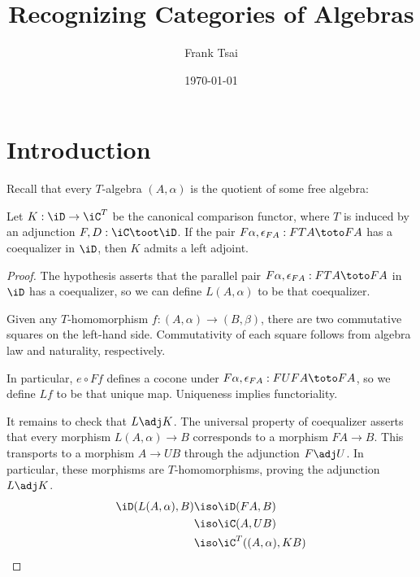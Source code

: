 \documentclass{amsart}
\title{Recognizing Categories of Algebras}
\author{Frank Tsai}
\date{\today}
\begin{document}
\maketitle
\tableofcontents

\section{Introduction}
\label{sec:introduction}

Recall that every $T$-algebra $(A,\alpha)$ is the quotient of some free algebra:
\begin{equation}
  \label{eq:beck-coequalizer}
  
\end{equation}

\begin{lem}\label{lem:beck-coequalizer-left-adjoint}
  Let $K : \iD \to \iC^{T}$ be the canonical comparison functor, where $T$ is induced by an adjunction $F,D : \iC \toot \iD$.
  If the pair $F\alpha,\epsilon_{FA} : FTA \toto FA$ has a coequalizer in $\iD$, then $K$ admits a left adjoint.
\end{lem}
\begin{proof}
  The hypothesis asserts that the parallel pair $F\alpha,\epsilon_{FA} : FTA \toto FA$ in $\iD$ has a coequalizer, so we can define $L(A,\alpha)$ to be that coequalizer.
  
  Given any $T$-homomorphism $f : (A,\alpha) \to (B,\beta)$, there are two commutative squares on the left-hand side.
  Commutativity of each square follows from algebra law and naturality, respectively.
  
  In particular, $e \circ Ff$ defines a cocone under $F\alpha,\epsilon_{FA} : FUFA \toto FA$, so we define $Lf$ to be that unique map.
  Uniqueness implies functoriality.

  It remains to check that $L \adj K$.
  The universal property of coequalizer asserts that every morphism $L(A,\alpha) \to B$ corresponds to a morphism $FA \to B$.
  This transports to a morphism $A \to UB$ through the adjunction $F \adj U$.
  In particular, these morphisms are $T$-homomorphisms, proving the adjunction $L \adj K$.
  \begin{align}
    \iD(L(A,\alpha),B) &\iso \iD(FA,B)\\
                  &\iso \iC(A,UB)\\
                  &\iso \iC^{T}((A,\alpha),KB)
  \end{align}
\end{proof}
\end{document}

